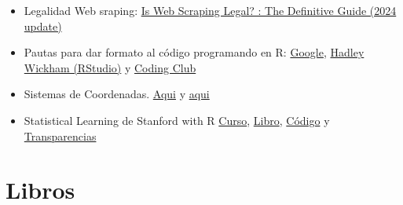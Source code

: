 \documentclass[
  letterpaper,
  DIV=11,
  numbers=noendperiod]{scrartcl}
\begin{document}
\begin{itemize}
  \href{https://github.com/GlobalFishingWatch/paper-industrial-activity/tree/main}{Github}.
  \href{https://figshare.com/articles/journal_contribution/Satellite_mapping_reveals_extensive_industrial_activity_at_sea_-_training_data/24309469}{Train
  data}.
  \href{https://figshare.com/articles/journal_contribution/Satellite_mapping_reveals_extensive_industrial_activity_at_sea_-_analysis_data/24309475}{Analysis
  data} and
  \href{https://globalfishingwatch.org/data-download/datasets/public-sar-vessel-detections:v20231026}{Vessel
  detection from Sentinel-1 SAR}
\item
  Legalidad Web sraping:
  \href{https://prowebscraper.com/blog/is-web-scraping-legal/}{Is Web
  Scraping Legal? : The Definitive Guide (2024 update)}
\item
  Pautas para dar formato al código programando en R:
  \href{https://google.github.io/styleguide/Rguide.xml}{Google},
  \href{http://adv-r.had.co.nz/Style.html}{Hadley Wickham (RStudio)} y
  \href{https://ourcodingclub.github.io/2017/04/25/etiquette.html\#syntax}{Coding
  Club}
\item
  Sistemas de Coordenadas.
  \href{https://rspatial.org/spatial/rst/6-crs.html}{Aqui} y
  \href{https://www.nceas.ucsb.edu/~frazier/RSpatialGuides/OverviewCoordinateReferenceSystems.pdf}{aqui}
\item
  Statistical Learning de Stanford with R
  \href{https://online.stanford.edu/courses/sohs-ystatslearning-statistical-learning-r}{Curso},
  \href{https://hastie.su.domains/ElemStatLearn/}{Libro},
  \href{https://github.com/khanhnamle1994/statistical-learning}{Código}
  y
  \href{https://github.com/khanhnamle1994/statistical-learning/tree/master/Lecture-Slides}{Transparencias}
\end{itemize}

\section{Libros}\label{libros}
\end{document}
